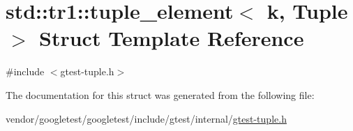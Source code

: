 \hypertarget{structstd_1_1tr1_1_1tuple__element}{}\section{std\+:\+:tr1\+:\+:tuple\+\_\+element$<$ k, Tuple $>$ Struct Template Reference}
\label{structstd_1_1tr1_1_1tuple__element}


{\ttfamily \#include $<$gtest-\/tuple.\+h$>$}



The documentation for this struct was generated from the following file\+:\begin{DoxyCompactItemize}
\item 
vendor/googletest/googletest/include/gtest/internal/\hyperlink{gtest-tuple_8h}{gtest-\/tuple.\+h}\end{DoxyCompactItemize}
